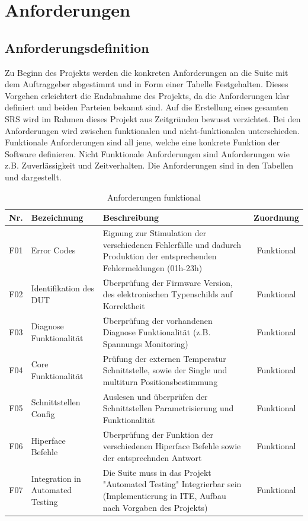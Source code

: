 \onehalfspacing
\section{Anforderungen}
	\subsection{Anforderungsdefinition}
Zu Beginn des Projekts werden die konkreten Anforderungen an die Suite mit dem Auftraggeber abgestimmt und in Form einer Tabelle Festgehalten. Dieses Vorgehen erleichtert die Endabnahme des Projekts, da die Anforderungen klar definiert und beiden Parteien bekannt sind. Auf die Erstellung eines gesamten \ac{SRS} wird im Rahmen dieses Projekt aus Zeitgründen bewusst verzichtet. Bei den Anforderungen wird zwischen funktionalen und nicht-funktionalen unterschieden. Funktionale Anforderungen sind all jene, welche eine konkrete Funktion der Software definieren. Nicht Funktionale Anforderungen sind Anforderungen wie z.B. Zuverlässigkeit und Zeitverhalten. Die Anforderungen sind in den Tabellen \dq {}\dq und \dq {}\dq dargestellt.
\newpage
\begin{table}[h]
\begin{center}
\begin{tabularx}{\textwidth}{|c|X|X|c|}
\hline
Nr. & Bezeichnung & Beschreibung & Zuordnung \\
\hline
F01 & Error Codes & Eignung zur Stimulation der verschiedenen Fehlerfälle und  dadurch Produktion der entsprechenden Fehlermeldungen (01h-23h) & Funktional \\
\hline
F02 & Identifikation des DUT & Überprüfung der Firmware Version, des elektronischen Typenschilds auf Korrektheit & Funktional \\
\hline
F03 & Diagnose Funktionalität & Überprüfung der vorhandenen Diagnose Funktionalität (z.B. Spannungs Monitoring) & Funktional \\
\hline
F04 & Core Funktionalität & Prüfung der externen Temperatur Schnittstelle, sowie der Single und multiturn Positionsbestimmung & Funktional \\
\hline
F05 & Schnittstellen Config & Auslesen und überprüfen der Schnittstellen Parametrisierung und Funktionalität & Funktional \\
\hline
F06 & Hiperface Befehle & Überprüfung der Funktion der verschiedenen Hiperface Befehle sowie der entsprechnden Antwort & Funktional \\
\hline
F07 & Integration in Automated Testing & Die Suite muss in das Projekt "Automated Testing" Integrierbar sein (Implementierung in ITE, Aufbau nach Vorgaben des Projekts) & Funktional \\
\hline
\end{tabularx}
\end{center}
\caption{Anforderungen funktional \label{tab:Anforderungstabelle}}
\end{table}

